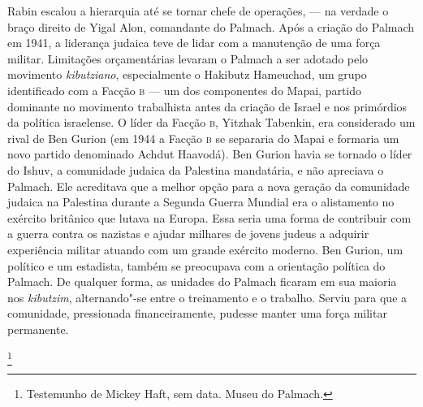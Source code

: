 Rabin escalou a hierarquia até se tornar chefe de operações, --- na
verdade o braço direito de Yigal Alon, comandante do Palmach. Após a
criação do Palmach em 1941, a liderança judaica teve de lidar com a
manutenção de uma força militar. Limitações orçamentárias
levaram o Palmach a ser adotado pelo movimento \textit{kibutziano}, especialmente
o Hakibutz Hameuchad, um grupo identificado com a Facção \textsc{b} --- um dos
componentes do Mapai, partido dominante no movimento trabalhista
antes da criação de Israel e nos primórdios da política israelense. O
líder da Facção \textsc{b}, Yitzhak Tabenkin, era considerado um rival de Ben
Gurion (em 1944 a Facção \textsc{b} se separaria do Mapai e formaria um novo
partido denominado Achdut Haavodá). Ben Gurion havia se
tornado o líder do Ishuv, a comunidade judaica da Palestina mandatária, e
não apreciava o Palmach. Ele acreditava que a melhor opção
para a nova geração da comunidade judaica na Palestina durante a Segunda
Guerra Mundial era o alistamento no exército britânico que lutava na
Europa. Essa seria uma forma de contribuir com a guerra contra os
nazistas e ajudar milhares de jovens judeus a adquirir experiência
militar atuando com um grande exército moderno. Ben Gurion, um político
e um estadista, também se preocupava com a orientação política
do Palmach. De qualquer forma, as unidades do Palmach ficaram em sua
maioria nos \textit{kibutzim}, alternando"-se entre o treinamento e o trabalho.
Serviu para que a comunidade, pressionada financeiramente, pudesse
manter uma força militar permanente.

\footnote{Testemunho de Mickey Haft, sem data. Museu do Palmach.}

